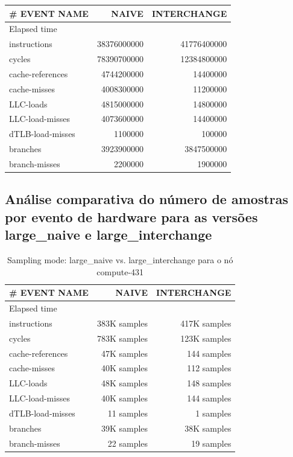 \documentclass[conference,compsoc]{IEEEtran}
\begin{document}
\begin{itemize}
\begin{table}[H]
\begin{tabular}{ | l | r | r |   }
  \hline
  \# EVENT NAME	 & NAIVE  & INTERCHANGE \\ \hline 
   Elapsed time & &  \\ \hline    
  instructions	& 38376000000 &  41776400000 \\ \hline    
cycles	& 78390700000 &  12384800000 \\ \hline    
cache-references	& 4744200000 &  14400000 \\ \hline    
cache-misses	&  4008300000 &  11200000 \\ \hline    
LLC-loads	& 4815000000  &  14800000 \\ \hline    
LLC-load-misses	& 4073600000 & 14400000  \\ \hline    
dTLB-load-misses & 1100000	& 100000  \\ \hline    
branches	& 3923900000 & 3847500000  \\ \hline    
branch-misses	&  2200000 &  1900000 \\ \hline    

  \end{tabular}
  \end{table}

\subsection{Análise comparativa do número de amostras por evento de hardware para as versões large\_naive e large\_interchange}




 \begin{table}[H]
  \caption{Sampling mode: large\_naive vs. large\_interchange
 para o nó compute-431}
  \label{table:search_sampling}
  \centering
  \begin{tabular}{ | l | r | r |   }

  \hline
  \# EVENT NAME	 & NAIVE  & INTERCHANGE \\ \hline   
  Elapsed time & &  \\ \hline    
  instructions & 383K samples	& 417K samples  \\ \hline    
cycles	& 783K  samples &  123K samples  \\ \hline    
cache-references &	47K samples & 144 samples   \\ \hline    
cache-misses & 40K samples	& 112 samples \\ \hline    
LLC-loads	 &  48K samples &  148 samples \\ \hline    
LLC-load-misses	& 40K samples & 144 samples  \\ \hline    
dTLB-load-misses	& 11 samples & 1 samples \\ \hline    
branches	&  39K samples &  38K samples \\ \hline    
branch-misses	& 22 samples & 19 samples \\ \hline    
   \end{tabular}
  \end{table}




\end{itemize}
\end{document}
